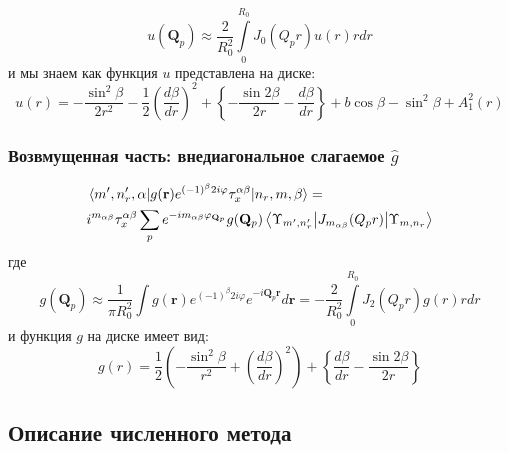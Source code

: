 \documentclass[a4paper,article,14pt]{extarticle}
\begin{document}
\begin{equation}
u (\mathbf{Q}_p) \approx \frac{2}{R_0^2}  \int\limits_{0}^{R_0}  J_0 (Q_p r ) u(r) r dr 
\end{equation} 
и мы знаем как функция $u$ представлена на диске:
\begin{equation}
u(r) = -\frac{\sin^2 \beta }{2r^2} - \frac{1}{2}\left( \frac{d\beta }{dr} \right)^2 +  \left\{  - \frac{\sin 2\beta }{2r}  - \frac{d\beta }{dr} \right\} + b\cos \beta - \sin ^ 2 \beta + A^2_1(r)
\end{equation}

\subsubsection{Возвмущенная часть: внедиагональное слагаемое $\hat g$}

\begin{equation}
\begin{aligned}
&\mel{m', n'_r, \alpha} {g(\mathbf{r})   e^{ (-1)^{\beta} 2  i   \varphi} \tau^{\alpha \beta}_x} {n_r,m,\beta} = \\ 
&i^{m_{\alpha \beta}} \tau^{\alpha \beta}_x \sum\limits_{p}      e^{-i m_{\alpha \beta} \varphi_{\mathbf{Q}_p}}  g(\mathbf{Q}_p)\mel{\Upsilon_{m', n'_r}} {J_{m_{\alpha \beta}} ( Q_p r) }{\Upsilon_{m, n_r}}
\end{aligned}
\end{equation}
\noindent где 
\begin{equation}
g (\mathbf{Q}_p) \approx \frac{1}{\pi R_0^2}  \int  g(\mathbf{r})   e^{ (-1)^{\beta} 2  i   \varphi} e^{-i \mathbf{Q}_p \mathbf{r}}  d\mathbf{r} = - \frac{2}{R_0^2}  \int\limits_{0}^{R_0}  J_2 (Q_p r ) g(r) r dr 
\end{equation} 
и функция $g$ на диске имеет вид:
\begin{equation}
g(r) = \frac{1}{2}\left(  - \frac{\sin ^2\beta }{r^2} + \left( \frac{d\beta }{dr} \right)^2 \right) 
+ \left\{ \frac{d\beta }{dr} - \frac{\sin 2\beta }{2r} \right\}
\end{equation}

\subsection{ Описание численного метода  }
\end{document}
